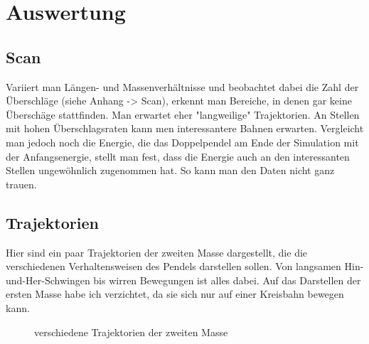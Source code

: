 \documentclass[12pt,a4paper,titlepage,headinclude,bibtotoc]{scrartcl}
\begin{document}
\section{Auswertung}
\subsection{Scan}
Variiert man Längen- und Massenverhältnisse und beobachtet dabei die Zahl der Überschläge (siehe Anhang -> Scan), erkennt man Bereiche, in denen gar keine Überschäge stattfinden. Man erwartet eher "langweilige" Trajektorien. An Stellen mit hohen Überschlagsraten kann men interessantere Bahnen erwarten.
Vergleicht man jedoch noch die Energie, die das Doppelpendel am Ende der Simulation mit der Anfangsenergie, stellt man fest, dass die Energie auch an den interessanten Stellen ungewöhnlich zugenommen hat.
So kann man den Daten nicht ganz trauen.

\subsection{Trajektorien}
Hier sind ein paar Trajektorien der zweiten Masse dargestellt, die die verschiedenen Verhaltensweisen des Pendels darstellen sollen. Von langsamen Hin-und-Her-Schwingen bis wirren Bewegungen ist alles dabei.
Auf das Darstellen der ersten Masse habe ich verzichtet, da sie sich nur auf einer Kreisbahn bewegen kann.

\begin{figure}[!htb]
	\centering
	  \hfill
	  \hfill
	\caption{verschiedene Trajektorien der zweiten Masse}
\end{figure}
\end{document}
